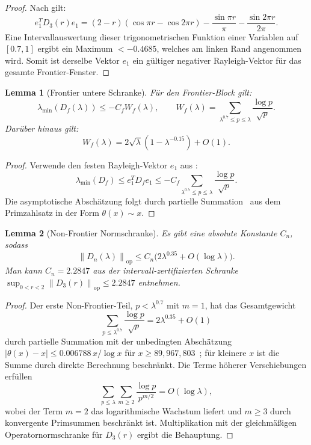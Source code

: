 \documentclass[11pt,a4paper]{article}
\newtheorem{lemma}[lemma]{Lemma}
\theoremstyle{remark}
\theoremstyle{plain}
\newcommand{\norm}[1]{\left\lVert #1 \right\rVert}
\begin{document}
\begin{proof}
Nach  gilt:
\[
  e_1^T D_3(r)e_1
  =(2-r)(\cos\pi r-\cos2\pi r)
  -\frac{\sin\pi r}{\pi}
  -\frac{\sin2\pi r}{2\pi}.
\]
Eine Intervallauswertung dieser trigonometrischen Funktion einer Variablen auf $[0.7,1]$ ergibt ein Maximum $<-0.4685$, welches am linken Rand angenommen wird. Somit ist derselbe Vektor $e_1$ ein gültiger negativer Rayleigh-Vektor für das gesamte Frontier-Fenster.
\end{proof}

\begin{lemma}[Frontier untere Schranke]
\label{lem:frontier}
Für den Frontier-Block gilt:
\[
  \lambda_{\min}(D_f(\lambda))
  \leq
  -C_f W_f(\lambda),
  \qquad
  W_f(\lambda)=
  \sum_{\lambda^{0.7}\leq p\leq\lambda}\frac{\log p}{\sqrt p}.
\]
Darüber hinaus gilt:
\[
  W_f(\lambda)=2\sqrt\lambda(1-\lambda^{-0.15})+O(1).
\]
\end{lemma}

\begin{proof}
Verwende den festen Rayleigh-Vektor $e_1$ aus :
\[
  \lambda_{\min}(D_f)
  \leq e_1^T D_f e_1
  \leq -C_f\sum_{\lambda^{0.7}\leq p\leq\lambda}\frac{\log p}{\sqrt p}.
\]
Die asymptotische Abschätzung folgt durch partielle Summation~\cite{IwaniecKowalski2004} aus dem Primzahlsatz in der Form $\theta(x)\sim x$.
\end{proof}

\begin{lemma}[Non-Frontier Normschranke]
\label{lem:nonfrontier}
Es gibt eine absolute Konstante $C_n$, sodass
\[
  \norm{D_n(\lambda)}_{\mathrm{op}}
  \leq C_n\bigl(2\lambda^{0.35}+O(\log\lambda)\bigr).
\]
Man kann $C_n=2.2847$ aus der intervall-zertifizierten Schranke $\sup_{0<r<2}\norm{D_3(r)}_{\mathrm{op}}\leq2.2847$ entnehmen.
\end{lemma}

\begin{proof}
Der erste Non-Frontier-Teil, $p<\lambda^{0.7}$ mit $m=1$, hat das Gesamtgewicht
\[
  \sum_{p\leq\lambda^{0.7}}\frac{\log p}{\sqrt p}
  =2\lambda^{0.35}+O(1)
\]
durch partielle Summation mit der unbedingten Abschätzung $|\theta(x)-x|\leq 0.006788\,x/\log x$ für $x\geq 89{,}967{,}803$~\cite{Dusart2010}; für kleinere $x$ ist die Summe durch direkte Berechnung beschränkt. Die Terme höherer Verschiebungen erfüllen
\[
  \sum_{p\leq\lambda}\sum_{m\geq2}\frac{\log p}{p^{m/2}}
  =O(\log\lambda),
\]
wobei der Term $m=2$ das logarithmische Wachstum liefert und $m\geq3$ durch konvergente Primsummen beschränkt ist. Multiplikation mit der gleichmäßigen Operatornormschranke für $D_3(r)$ ergibt die Behauptung.
\end{proof}
\end{document}
